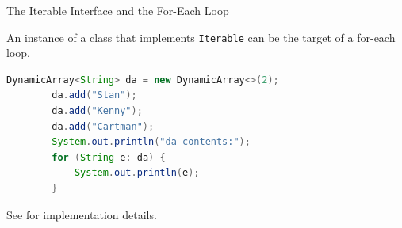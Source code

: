 \documentclass{beamer}
\begin{document}
\begin{frame}[fragile]{The Iterable Interface and the For-Each Loop}

An instance of a class that implements {\tt Iterable} can be the target of a for-each loop.
\begin{lstlisting}[language=Java]
        DynamicArray<String> da = new DynamicArray<>(2);
        da.add("Stan");
        da.add("Kenny");
        da.add("Cartman");
        System.out.println("da contents:");
        for (String e: da) {
            System.out.println(e);
        }

\end{lstlisting}

See  for implementation details.

\end{frame}







\end{document}

